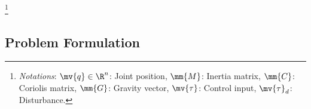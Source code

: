 \documentclass[8pt, aspectratio=169, handout]{beamer}
\begin{document}
\begin{frame}{\insertsubsectionhead}
\begin{columns}
  \end{columns}

    \let\thefootnote\relax\footnote{
      \textit{Notations}: 
        $\mv{q}\in\R^n$: Joint position, $\mm{M}$: Inertia matrix, $\mm{C}$: Coriolis matrix, $\mm{G}$: Gravity vector, $\mv{\tau}$: Control input, $\mv{\tau}_d$: Disturbance.
      }

\end{frame}

\subsection{Problem Formulation}

\end{document}
